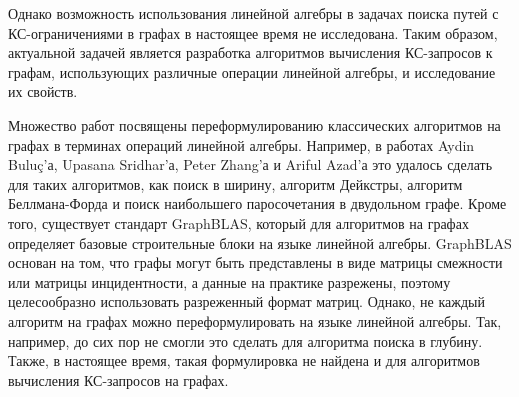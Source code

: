 Однако возможность использования линейной алгебры в задачах поиска путей с КС-ограничениями в графах в настоящее время не исследована. Таким образом, актуальной задачей является разработка алгоритмов вычисления КС-запросов к графам, использующих различные операции линейной алгебры, и исследование их свойств.





{\progress}
Множество работ посвящены переформулированию классических алгоритмов на графах в терминах операций линейной алгебры. Например, в работах Aydin Bulu\c{c}'а, Upasana Sridhar'а,
Peter Zhang'а и Ariful Azad'а это удалось сделать для таких алгоритмов, как поиск в ширину, алгоритм Дейкстры, алгоритм Беллмана-Форда и поиск наибольшего паросочетания в двудольном графе. Кроме того, существует стандарт GraphBLAS, который для алгоритмов на графах определяет базовые строительные блоки на языке линейной алгебры. GraphBLAS основан на том, что графы могут быть представлены в виде матрицы смежности или матрицы инцидентности, а данные на практике разрежены, поэтому целесообразно использовать разреженный формат матриц. Однако, не каждый алгоритм на графах можно переформулировать на языке линейной алгебры. Так, например, до сих пор не смогли это сделать для алгоритма поиска в глубину. Также, в настоящее время, такая формулировка не найдена и для алгоритмов вычисления КС-запросов на графах.

